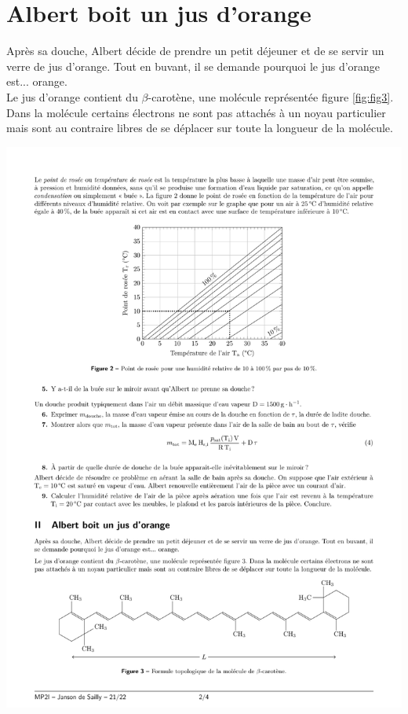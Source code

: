 \documentclass[a4paper,french,bookmarks]{article}
\begin{document}
\section{Albert boit un jus d'orange}

Après sa douche, Albert décide de prendre un petit déjeuner et de se servir un verre de jus d'orange. Tout en buvant, il se demande pourquoi le jus d'orange est... orange.\\[2pt]
%
Le jus d'orange contient du $\beta$-carotène, une molécule représentée figure \ref{fig:fig3}. Dans la molécule certains électrons ne sont pas attachés à un noyau particulier mais sont au contraire libres de se déplacer sur toute la longueur de la molécule.

\begin{center}
    \includegraphics[]{dm7fig/betacarotene.pdf}
	\label{fig:fig3}
\end{center}
\end{document}
